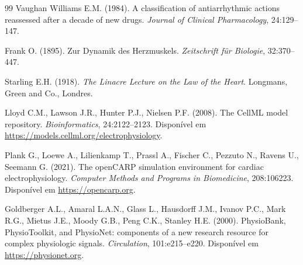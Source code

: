 \begin{thebibliography}{99}
 Vaughan Williams E.M. (1984). A classification of
antiarrhythmic actions reassessed after a decade of new drugs.
\textit{Journal of Clinical Pharmacology}, 24:129--147.

 Frank O. (1895). Zur Dynamik des Herzmuskels.
\textit{Zeitschrift für Biologie}, 32:370--447.

 Starling E.H. (1918). \textit{The Linacre Lecture on
the Law of the Heart}. Longmans, Green and Co., Londres.

 Lloyd C.M., Lawson J.R., Hunter P.J., Nielsen P.F.
(2008). The CellML model repository. \textit{Bioinformatics},
24:2122--2123. Disponível em \url{https://models.cellml.org/electrophysiology}.

 Plank G., Loewe A., Lilienkamp T., Prassl A.,
Fischer C., Pezzuto N., Ravens U., Seemann G. (2021). The openCARP
simulation environment for cardiac electrophysiology. \textit{Computer
Methods and Programs in Biomedicine}, 208:106223. Disponível em
\url{https://opencarp.org}.

 Goldberger A.L., Amaral L.A.N., Glass L., Hausdorff
J.M., Ivanov P.C., Mark R.G., Mietus J.E., Moody G.B., Peng C.K.,
Stanley H.E. (2000). PhysioBank, PhysioToolkit, and PhysioNet:
components of a new research resource for complex physiologic signals.
\textit{Circulation}, 101:e215--e220. Disponível em \url{https://physionet.org}.
\end{thebibliography}
